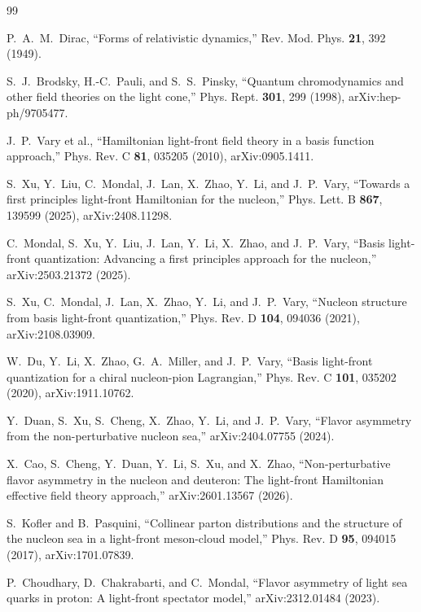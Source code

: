 \documentclass[11pt]{article}
\begin{document}
\small
\begin{thebibliography}{99}
\raggedright

P.~A.~M.~Dirac,
``Forms of relativistic dynamics,''
Rev. Mod. Phys. \textbf{21}, 392 (1949).

S.~J.~Brodsky, H.-C.~Pauli, and S.~S.~Pinsky,
``Quantum chromodynamics and other field theories on the light cone,''
Phys. Rept. \textbf{301}, 299 (1998),
arXiv:hep-ph/9705477.

J.~P.~Vary et al.,
``Hamiltonian light-front field theory in a basis function approach,''
Phys. Rev. C \textbf{81}, 035205 (2010),
arXiv:0905.1411.

S.~Xu, Y.~Liu, C.~Mondal, J.~Lan, X.~Zhao, Y.~Li, and J.~P.~Vary,
``Towards a first principles light-front Hamiltonian for the nucleon,''
Phys. Lett. B \textbf{867}, 139599 (2025),
arXiv:2408.11298.

C.~Mondal, S.~Xu, Y.~Liu, J.~Lan, Y.~Li, X.~Zhao, and J.~P.~Vary,
``Basis light-front quantization: Advancing a first principles approach for
the nucleon,''
arXiv:2503.21372 (2025).

S.~Xu, C.~Mondal, J.~Lan, X.~Zhao, Y.~Li, and J.~P.~Vary,
``Nucleon structure from basis light-front quantization,''
Phys. Rev. D \textbf{104}, 094036 (2021),
arXiv:2108.03909.

W.~Du, Y.~Li, X.~Zhao, G.~A.~Miller, and J.~P.~Vary,
``Basis light-front quantization for a chiral nucleon-pion Lagrangian,''
Phys. Rev. C \textbf{101}, 035202 (2020),
arXiv:1911.10762.

Y.~Duan, S.~Xu, S.~Cheng, X.~Zhao, Y.~Li, and J.~P.~Vary,
``Flavor asymmetry from the non-perturbative nucleon sea,''
arXiv:2404.07755 (2024).

X.~Cao, S.~Cheng, Y.~Duan, Y.~Li, S.~Xu, and X.~Zhao,
``Non-perturbative flavor asymmetry in the nucleon and deuteron: The
light-front Hamiltonian effective field theory approach,''
arXiv:2601.13567 (2026).

S.~Kofler and B.~Pasquini,
``Collinear parton distributions and the structure of the nucleon sea in a
light-front meson-cloud model,''
Phys. Rev. D \textbf{95}, 094015 (2017),
arXiv:1701.07839.

P.~Choudhary, D.~Chakrabarti, and C.~Mondal,
``Flavor asymmetry of light sea quarks in proton: A light-front spectator
model,''
arXiv:2312.01484 (2023).


\end{thebibliography}
\end{document}
